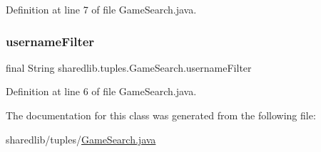 Definition at line 7 of file Game\+Search.\+java.

\hypertarget{classsharedlib_1_1tuples_1_1_game_search_a9519b13f2ff02e7e7d4d25fc6cf0f89d}{}\label{classsharedlib_1_1tuples_1_1_game_search_a9519b13f2ff02e7e7d4d25fc6cf0f89d} 
\subsubsection{\texorpdfstring{username\+Filter}{usernameFilter}}
{\footnotesize\ttfamily final String sharedlib.\+tuples.\+Game\+Search.\+username\+Filter}



Definition at line 6 of file Game\+Search.\+java.



The documentation for this class was generated from the following file\+:\begin{DoxyCompactItemize}
\item 
sharedlib/tuples/\hyperlink{_game_search_8java}{Game\+Search.\+java}\end{DoxyCompactItemize}
